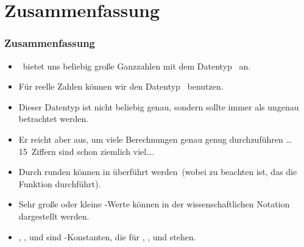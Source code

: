 \documentclass[aspectratio=169,mathserif,notheorems]{beamer}%
\begin{document}
\section{Zusammenfassung}%
%
\begin{frame}%
\frametitle{Zusammenfassung}%
\begin{itemize}%
\item \python\ bietet uns beliebig große Ganzzahlen mit dem Datentyp~ an.%
\item<2-> Für reelle Zahlen können wir den Datentyp~ benutzen.%
\item<3-> Dieser Datentyp ist \alert{nicht} beliebig genau, sondern sollte \alert{immer} als ungenau betrachtet werden.%
\item<4-> Er reicht aber aus, um viele Berechnungen genau genug durchzuführen {\dots} 15~Ziffern sind schon ziemlich viel\dots.%
\item<5-> Durch runden können  in  überführt werden~(wobei zu beachten ist, das die Funktion   durchführt).%
\item<6-> Sehr große oder kleine -Werte können in der wissenschaftlichen Notation dargestellt werden.%
\item<7-> , , und  sind -Konstanten, die für , , und  stehen.%
\end{itemize}%
\end{frame}%
%
\endPresentation%
\end{document}
